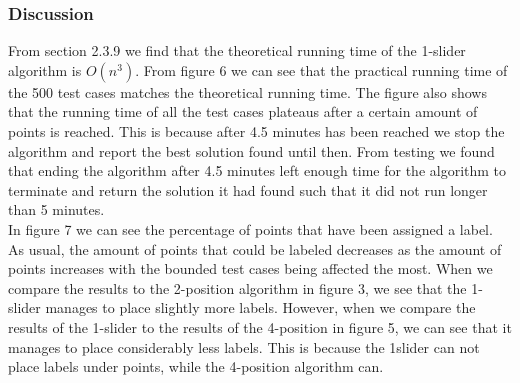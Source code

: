 \documentclass[crop=false,a4paper,oneside,11pt]{standalone}
\begin{document}
\subsubsection{Discussion}
From section 2.3.9 we find that the theoretical running time of the 1-slider algorithm is $O(n^3)$. From figure 6 we can see that the practical running time of the 500 test cases matches the theoretical running time. The figure also shows that the running time of all the test cases plateaus after a certain amount of points is reached. This is because after 4.5 minutes has been reached we stop the algorithm and report the best solution found until then. From testing we found that ending the algorithm after 4.5 minutes left enough time for the algorithm to terminate and return the solution it had found such that it did not run longer than 5 minutes.\\
In figure 7 we can see the percentage of points that have been assigned a label. As usual, the amount of points that could be labeled decreases as the amount of points increases with the bounded test cases being affected the most. When we compare the results to the 2-position algorithm in figure 3, we see that the 1-slider manages to place slightly more labels. However, when we compare the results of the 1-slider to the results of the 4-position in figure 5, we can see that it manages to place considerably less labels. This is because the 1slider can not place labels under points, while the 4-position algorithm can.
\end{document}
